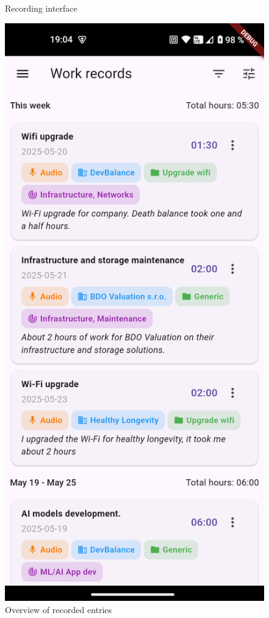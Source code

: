 \documentclass[
  digital,     %
  oneside,     %
  nosansbold,  %
  nocolorbold, %
  lof,         %
  lot,         %
]{fithesis4}
\begin{document}
\begin{center}
\begin{minipage}{0.45\textwidth}
\begin{figure}[H]
    \caption{Recording interface}
    \label{fig:recording_screen}
  \end{figure}
\end{minipage}
\hspace{0.05\textwidth}
\begin{minipage}{0.45\textwidth}
  \begin{figure}[H]
    \centering
    \includegraphics[width=\textwidth]{assets/records_screen.png}
    \caption{Overview of recorded entries}
    \label{fig:records_screen}
  \end{figure}
\end{minipage}
\end{center}
\end{document}
